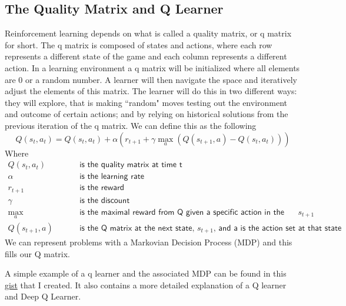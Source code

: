 \documentclass[12pt,letter]{article}
\begin{document}
\subsection{The Quality Matrix and Q Learner}
Reinforcement learning depends on what is called a quality matrix, or q matrix 
for short. The q matrix is composed of states and actions, where each row 
represents a different state of the game and each column represents a different
action. In a learning environment a q matrix will be initialized where all elements
are 0 or a random number. A learner will then navigate the space and iteratively 
adjust the elements of this matrix. The learner will do this in two different ways:
they will explore, that is making ``random" moves testing out the environment
and outcome of certain actions; and by relying on historical solutions from the
previous iteration of the q matrix. We can define this as the following
\begin{equation}
    Q(s_t,a_t) = Q(s_t, a_t) + \alpha(r_{t+1} + \gamma\max_a(Q(s_{t+1},a)-Q(s_t,a_t)))
\end{equation}
Where
\begin{align*}
    Q(s_t,a_t)  \hspace{1cm} & \textsf{is the quality matrix at time t}\\
    \alpha      \hspace{1cm} & \textsf{is the learning rate}\\
    r_{t+1}     \hspace{1cm} & \textsf{is the reward}\\
    \gamma      \hspace{1cm} & \textsf{is the discount}\\
    \max_a      \hspace{1cm} & \textsf{is the maximal reward from Q given a specific action in the
                                       action set of } s_{t+1}\\
    Q(s_{t+1},a)\hspace{1cm} & \textsf{is the Q matrix at the next state, } s_{t+1} 
                   \textsf{, and a is the action set at that state}
\end{align*}
We can represent problems with a Markovian Decision Process (MDP) and this fills
our Q matrix. 

A simple example of a q learner and the associated MDP can be found in this
\href{https://gist.github.com/stevenwalton/4e4b664d494b35be2d6882c7e50eb893}
{gist} that I created. It also contains a more detailed explanation of a
Q learner and Deep Q Learner. 
\end{document}
